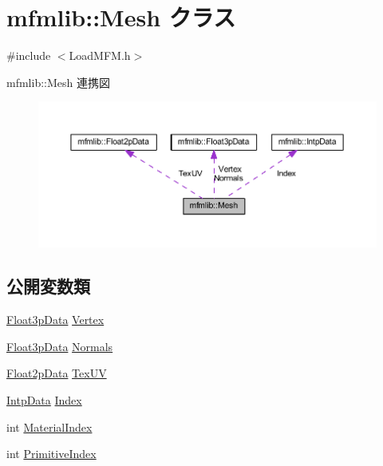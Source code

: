 \hypertarget{classmfmlib_1_1_mesh}{}\section{mfmlib\+:\+:Mesh クラス}
\label{classmfmlib_1_1_mesh}


{\ttfamily \#include $<$Load\+M\+F\+M.\+h$>$}



mfmlib\+:\+:Mesh 連携図\nopagebreak
\begin{figure}[H]
\begin{center}
\leavevmode
\includegraphics[width=350pt]{classmfmlib_1_1_mesh__coll__graph}
\end{center}
\end{figure}
\subsection*{公開変数類}
\begin{DoxyCompactItemize}
\item 
\mbox{\hyperlink{classmfmlib_1_1_float3p_data}{Float3p\+Data}} \mbox{\hyperlink{classmfmlib_1_1_mesh_aa51a50ca2d51c283769d0efff0122d81}{Vertex}}
\item 
\mbox{\hyperlink{classmfmlib_1_1_float3p_data}{Float3p\+Data}} \mbox{\hyperlink{classmfmlib_1_1_mesh_acc9099d9995b1f42dedc7ad0a4320d69}{Normals}}
\item 
\mbox{\hyperlink{classmfmlib_1_1_float2p_data}{Float2p\+Data}} \mbox{\hyperlink{classmfmlib_1_1_mesh_a8cf113dcdb5f339dbe192072205d9210}{Tex\+UV}}
\item 
\mbox{\hyperlink{classmfmlib_1_1_intp_data}{Intp\+Data}} \mbox{\hyperlink{classmfmlib_1_1_mesh_aa6919522434d9867a885ddfcabb314b1}{Index}}
\item 
int \mbox{\hyperlink{classmfmlib_1_1_mesh_ad9b38a36ca097956b5b98aef018737b2}{Material\+Index}}
\item 
int \mbox{\hyperlink{classmfmlib_1_1_mesh_aae7ea245b25b22be622c58b21c4a2a06}{Primitive\+Index}}
\end{DoxyCompactItemize}


